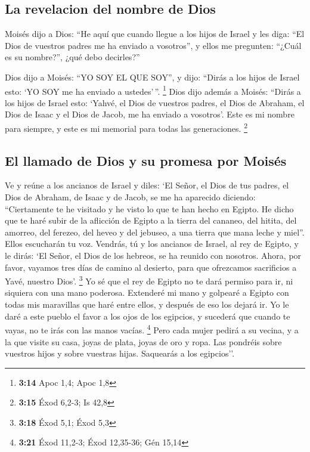 \begin{paracol}{2}
{\subsection{La revelacion del nombre de
Dios}\label{la-revelacion-del-nombre-de-dios}}

 Moisés dijo a Dios: ``He aquí que cuando llegue a los
hijos de Israel y les diga: ``El Dios de vuestros padres me ha enviado a
vosotros'', y ellos me pregunten: ``¿Cuál es su nombre?'', ¿qué debo
decirles?''

 Dios dijo a Moisés: ``YO SOY EL QUE SOY'', y dijo:
``Dirás a los hijos de Israel esto: `YO SOY me ha enviado a
ustedes'\,''. \footnote{\textbf{3:14} Apoc 1,4; Apoc 1,8}
 Dios dijo además a Moisés: ``Dirás a los hijos de Israel
esto: `Yahvé, el Dios de vuestros padres, el Dios de Abraham, el Dios de
Isaac y el Dios de Jacob, me ha enviado a vosotros'. Este es mi nombre
para siempre, y este es mi memorial para todas las generaciones.
\footnote{\textbf{3:15} Éxod 6,2-3; Is 42,8}

\hypertarget{el-llamado-de-dios-y-su-promesa-por-moisuxe9s}{%
\subsection{El llamado de Dios y su promesa por
Moisés}\label{el-llamado-de-dios-y-su-promesa-por-moisuxe9s}}

 Ve y reúne a los ancianos de Israel y diles: `El Señor,
el Dios de tus padres, el Dios de Abraham, de Isaac y de Jacob, se me ha
aparecido diciendo: ``Ciertamente te he visitado y he visto lo que te
han hecho en Egipto.  He dicho que te haré subir de la
aflicción de Egipto a la tierra del cananeo, del hitita, del amorreo,
del ferezeo, del heveo y del jebuseo, a una tierra que mana leche y
miel''.  Ellos escucharán tu voz. Vendrás, tú y los
ancianos de Israel, al rey de Egipto, y le dirás: `El Señor, el Dios de
los hebreos, se ha reunido con nosotros. Ahora, por favor, vayamos tres
días de camino al desierto, para que ofrezcamos sacrificios a Yavé,
nuestro Dios'. \footnote{\textbf{3:18} Éxod 5,1; Éxod 5,3}
 Yo sé que el rey de Egipto no te dará permiso para ir,
ni siquiera con una mano poderosa.  Extenderé mi mano y
golpearé a Egipto con todas mis maravillas que haré entre ellos, y
después de eso los dejará ir.  Yo le daré a este pueblo
el favor a los ojos de los egipcios, y sucederá que cuando te vayas, no
te irás con las manos vacías. \footnote{\textbf{3:21} Éxod 11,2-3; Éxod
  12,35-36; Gén 15,14}  Pero cada mujer pedirá a su
vecina, y a la que visite su casa, joyas de plata, joyas de oro y ropa.
Las pondréis sobre vuestros hijos y sobre vuestras hijas. Saquearás a
los egipcios''.


\end{paracol}

